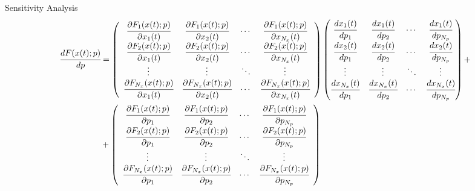 \documentclass[8pt]{beamer}
\begin{document}
	\begin{frame}[fragile]{Sensitivity Analysis}
		\tiny{\begin{align*}
			\begin{split}
				\cfrac{d F(x(t);p)}{dp} &=\left(\begin{array}{cccc}
					\cfrac{\partial F_{1}(x(t);p)}{\partial x_{1}(t)} & \cfrac{\partial F_{1}(x(t);p)}{\partial x_{2}(t)} & \cdots & \cfrac{\partial F_{1}(x(t);p)}{\partial x_{N_x}(t)}\\
					\cfrac{\partial F_{2}(x(t);p)}{\partial x_{1}(t)} & \cfrac{\partial F_{2}(x(t);p)}{\partial x_{2}(t)} & \cdots & \cfrac{\partial F_{2}(x(t);p)}{\partial x_{N_x}(t)}\\
					\vdots & \vdots & \ddots & \vdots\\ 
					\cfrac{\partial F_{N_x}(x(t);p)}{\partial x_{1}(t)} & \cfrac{\partial F_{N_x}(x(t);p)}{\partial x_{2}(t)} & \cdots & \cfrac{\partial F_{N_x}(x(t);p)}{\partial x_{N_x}(t)}
				\end{array}\right)
			\begin{pmatrix}
				\cfrac{d x_{1}(t)}{d p_{1}} 	& \cfrac{d x_{1}(t)}{d p_{2}}     & \cdots & \cfrac{d x_{1}(t)}{d p_{N_p}}\\
				\cfrac{d x_{2}(t)}{d p_{1}}		& \cfrac{d x_{2}(t)}{d p_{2}}     & \cdots & \cfrac{d x_{2}(t)}{d p_{N_p}}\\
				\vdots					 	    & \vdots 					   	  & \ddots & \vdots\\
				\cfrac{d x_{N_x}(t)}{d p_{1}} 	& \cfrac{d x_{N_x}(t)}{d p_{2}}   & \cdots & \cfrac{d x_{N_x}(t)}{d p_{N_p}}
			\end{pmatrix}
		 + \\
	   & + \left(\begin{array}{cccc}
				\cfrac{\partial F_{1}(x(t);p)}{\partial p_{1}} & \cfrac{\partial F_{1}(x(t);p)}{\partial p_{2}} & \cdots & \cfrac{\partial F_{1}(x(t);p)}{\partial p_{N_p}}\\
				\cfrac{\partial F_{2}(x(t);p)}{\partial p_{1}} & \cfrac{\partial F_{2}(x(t);p)}{\partial p_{2}} & \cdots & \cfrac{\partial F_{2}(x(t);p)}{\partial p_{N_p}}\\
				\vdots & \vdots & \ddots & \vdots\\
				\cfrac{\partial F_{N_x}(x(t);p)}{\partial p_{1}} & \cfrac{\partial F_{N_x}(x(t);p)}{\partial p_{2}} & \cdots & \cfrac{\partial F_{N_x}(x(t);p)}{\partial p_{N_p}}
			\end{array}\right)
	\end{split}\end{align*}
	}
	\end{frame}
\end{document}
